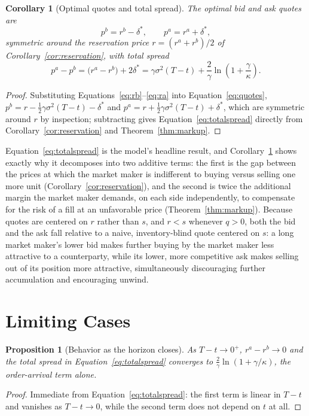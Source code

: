 \documentclass[11pt]{article}
\newtheorem{proposition}{Proposition}
\newtheorem{corollary}{Corollary}
\theoremstyle{remark}
\theoremstyle{definition}
\begin{document}
\begin{corollary}[Optimal quotes and total spread]
\label{cor:quotes}
The optimal bid and ask quotes are
\begin{equation}
p^{b} = r^b - \delta^{*}, \qquad p^{a} = r^a + \delta^{*},
\label{eq:quotes}
\end{equation}
symmetric around the reservation price $r=(r^a+r^b)/2$ of Corollary~\ref{cor:reservation}, with total spread
\begin{equation}
p^a - p^b = \big(r^a-r^b\big) + 2\delta^{*} = \gamma\sigma^2(T-t) + \frac{2}{\gamma}\ln\!\left(1+\frac{\gamma}{\kappa}\right).
\label{eq:totalspread}
\end{equation}
\end{corollary}
\begin{proof}
Substituting Equations~\eqref{eq:rb}--\eqref{eq:ra} into Equation~\eqref{eq:quotes}, $p^b = r-\tfrac12\gamma\sigma^2(T-t)-\delta^{*}$ and $p^a=r+\tfrac12\gamma\sigma^2(T-t)+\delta^{*}$, which are symmetric around $r$ by inspection; subtracting gives Equation~\eqref{eq:totalspread} directly from Corollary~\ref{cor:reservation} and Theorem~\ref{thm:markup}.
\end{proof}

Equation~\eqref{eq:totalspread} is the model's headline result, and Corollary~\ref{cor:quotes} shows exactly why it decomposes into two additive terms: the first is the gap between the prices at which the market maker is indifferent to buying versus selling one more unit (Corollary~\ref{cor:reservation}), and the second is twice the additional margin the market maker demands, on each side independently, to compensate for the risk of a fill at an unfavorable price (Theorem~\ref{thm:markup}). Because quotes are centered on $r$ rather than $s$, and $r<s$ whenever $q>0$, both the bid and the ask fall relative to a naive, inventory-blind quote centered on $s$: a long market maker's lower bid makes further buying by the market maker less attractive to a counterparty, while its lower, more competitive ask makes selling out of its position more attractive, simultaneously discouraging further accumulation and encouraging unwind.

\section{Limiting Cases}
\label{sec:limits}

\begin{proposition}[Behavior as the horizon closes]
\label{prop:horizon}
As $T-t\to0^+$, $r^a-r^b\to0$ and the total spread in Equation~\eqref{eq:totalspread} converges to $\tfrac{2}{\gamma}\ln(1+\gamma/\kappa)$, the order-arrival term alone.
\end{proposition}
\begin{proof}
Immediate from Equation~\eqref{eq:totalspread}: the first term is linear in $T-t$ and vanishes as $T-t\to0$, while the second term does not depend on $t$ at all.
\end{proof}
\end{document}
